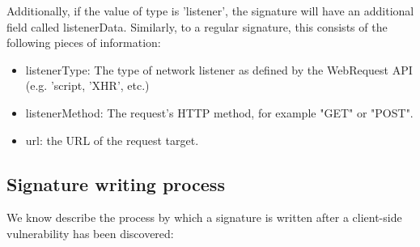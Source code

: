 Additionally, if the value of type is 'listener', the signature will have an additional field called listenerData. Similarly, to a regular signature, this consists of the following pieces of information:
\begin{itemize}
	\item 
	listenerType: The type of network listener as defined by the WebRequest API (e.g. 'script, 'XHR', etc.)
	\item
	listenerMethod: The request's HTTP method, for example "GET" or "POST".
	\item
	url: the URL of the request target.
\end{itemize}

\subsection{Signature writing process}
We know describe the process by which a signature is written after a client-side vulnerability has been discovered:
